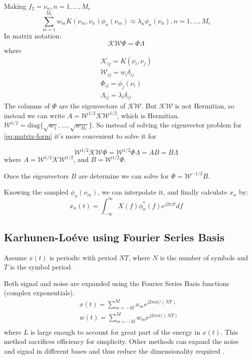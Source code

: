 \documentclass[a4paper]{article}
\begin{document}
Making $f_2 = \nu_n, n = 1,\ldots, M_e$
\begin{equation}
\sum_{m=1}^{M_e}w_mK(\nu_m, \nu_n)\phi_n(\nu_m) \approx \lambda_n\phi_n(\nu_n), n = 1,\ldots, M_e
\end{equation}
In matrix notation:
\begin{equation} \label{eq:matrix-form}
\mathcal{K}\mathcal{W}\Phi = \Phi\Lambda
\end{equation}
where 
\begin{align}
\mathcal{K}_{ij} = K(\nu_i, \nu_j) \\
\mathcal{W}_{ij} = w_i\delta_{ij} \\
\Phi_{ij} = \phi_j(\nu_i) \\
\Lambda_{ij} = \lambda_i\delta_{ij}
\end{align}
The columns of $\Phi$ are the eigenvectors of $\mathcal{K}\mathcal{W}$. But $\mathcal{K}\mathcal{W}$ is not Hermitian, so instead we can write $A = \mathcal{W}^{1/2}\mathcal{K}\mathcal{W}^{1/2}$, which is Hermitian. $\mathcal{W}^{1/2} = \mathrm{diag}\{\sqrt{w_1},\ldots,\sqrt{w_{M_e}}\}$. So instead of solving the eigenvector problem for \eqref{eq:matrix-form} it's more convenient to solve it for

\begin{equation} \label{eq:matrix-form}
\mathcal{W}^{1/2}\mathcal{K}\mathcal{W}\Phi = \mathcal{W}^{1/2}\Phi\Lambda = AB = B\Lambda
\end{equation}
where $A = \mathcal{W}^{1/2}\mathcal{K}\mathcal{W}^{1/2}$, and $B = \mathcal{W}^{1/2}\Phi$.

Once the eigenvectors $B$ are determine we can solve for $\Phi = \mathcal{W}^{-1/2}B$.

Knowing the sampled $\phi_n(\nu_m)$, we can interpolate it, and finally calculate $x_n$ by:
\begin{equation}
x_n(t) = \int_{-\infty}^{\infty}X(f)\phi_n^*(f)e^{j2\pi ft}df
\end{equation}

\subsection{Karhunen-Loéve using Fourier Series Basis}

Assume $x(t)$ is periodic with period $NT$, where $N$ is the number of symbols and $T$ is the symbol period.

Both signal and noise are expanded using the Fourier Series Basis functions (complex exponentials). 
\begin{align} \label{fourier-series}
& x(t) = \sum_{m=-M}^M x_me^{j2\pi n t/(NT)} \\
& w(t) = \sum_{m=-M}^M w_me^{j2\pi n t/(NT)} \\
\end{align}
where $L$ is large enough to account for great part of the energy in $x(t)$. This method sacrifices efficiency for simplicity. Other methods can expand the noise and signal in different bases and thus reduce the dimensionality required \cite{forestieri}.
\end{document}
